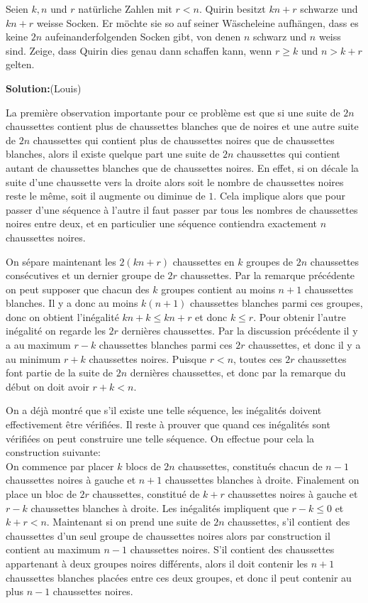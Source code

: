 Seien $k,n$ und $r$ natürliche Zahlen mit $r<n$. Quirin besitzt $kn+r$ schwarze und $kn+r$ weisse Socken. Er möchte sie so auf seiner Wäscheleine aufhängen, dass es keine $2n$ aufeinanderfolgenden Socken gibt, von denen $n$ schwarz und $n$ weiss sind. Zeige, dass Quirin dies genau dann schaffen kann, wenn $r\geq k$ und $n > k+r$ gelten.

\textbf{Solution:}(Louis)

La première observation importante pour ce problème est que si une suite de $2n$ chaussettes contient plus de chaussettes blanches que de noires et une autre suite de $2n$ chaussettes qui contient plus de chaussettes noires que de chaussettes blanches, alors il existe quelque part une suite de $2n$ chaussettes qui contient autant de chaussettes blanches que de chaussettes noires. En effet, si on décale la suite d'une chaussette vers la droite alors soit le nombre de chaussettes noires reste le même, soit il augmente ou diminue de $1$. Cela implique alors que pour passer d'une séquence à l'autre il faut passer par tous les nombres de chaussettes noires entre deux, et en particulier une séquence contiendra exactement $n$ chaussettes noires.

On sépare maintenant les $2(kn+r)$ chaussettes en $k$ groupes de $2n$ chaussettes consécutives et un dernier groupe de $2r$ chaussettes. Par la remarque précédente on peut supposer que chacun des $k$ groupes contient au moins $n+1$ chaussettes blanches. Il y a donc au moins $k(n+1)$ chaussettes blanches parmi ces groupes, donc on obtient l'inégalité $kn+k \leq kn+r$ et donc $k \leq r$. Pour obtenir l'autre inégalité on regarde les $2r$ dernières chaussettes. Par la discussion précédente il y a au maximum $r-k$ chaussettes blanches parmi ces $2r$ chaussettes, et donc il y a au minimum $r+k$ chaussettes noires. Puisque $r < n$, toutes ces $2r$ chaussettes font partie de la suite de $2n$ dernières chaussettes, et donc par la remarque du début on doit avoir $r+k < n$.

On a déjà montré que s'il existe une telle séquence, les inégalités doivent effectivement être vérifiées. Il reste à prouver que quand ces inégalités sont vérifiées on peut construire une telle séquence. On effectue pour cela la construction suivante:\\
On commence par placer $k$ blocs de $2n$ chaussettes, constitués chacun de $n-1$ chaussettes noires à gauche et $n+1$ chaussettes blanches à droite. Finalement on place un bloc de $2r$ chaussettes, constitué de $k+r$ chaussettes noires à gauche et $r-k$ chaussettes blanches à droite.
Les inégalités impliquent que $r-k \leq 0$ et $k+r < n$. Maintenant si on prend une suite de $2n$ chaussettes, s'il contient des chaussettes d'un seul groupe de chaussettes noires alors par construction il contient au maximum $n-1$ chaussettes noires. S'il contient des chaussettes appartenant à deux groupes noires différents, alors il doit contenir les $n+1$ chaussettes blanches placées entre ces deux groupes, et donc il peut contenir au plus $n-1$ chaussettes noires.

